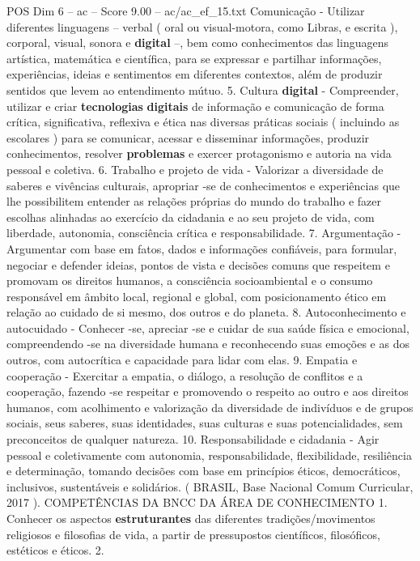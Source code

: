 \begin{textsample}{POS Dim 6 – ac – Score 9.00 – ac/ac\_ef\_15.txt}
Comunicação - Utilizar diferentes linguagens – verbal ( oral ou visual-motora, como Libras, e escrita ), corporal, visual, sonora e \textbf{digital} –, bem como conhecimentos das linguagens artística, matemática e científica, para se expressar e partilhar informações, experiências, ideias e sentimentos em diferentes contextos, além de produzir sentidos que levem ao entendimento mútuo. 5.
Cultura \textbf{digital} - Compreender, utilizar e criar \textbf{tecnologias} \textbf{digitais} de informação e comunicação de forma crítica, significativa, reflexiva e ética nas diversas práticas sociais ( incluindo as escolares ) para se comunicar, acessar e disseminar informações, produzir conhecimentos, resolver \textbf{problemas} e exercer protagonismo e autoria na vida pessoal e coletiva. 6.
Trabalho e projeto de vida - Valorizar a diversidade de saberes e vivências culturais, apropriar -se de conhecimentos e experiências que lhe possibilitem entender as relações próprias do mundo do trabalho e fazer escolhas alinhadas ao exercício da cidadania e ao seu projeto de vida, com liberdade, autonomia, consciência crítica e responsabilidade. 7.
Argumentação - Argumentar com base em fatos, dados e informações confiáveis, para formular, negociar e defender ideias, pontos de vista e decisões comuns que respeitem e promovam os direitos humanos, a consciência socioambiental e o consumo responsável em âmbito local, regional e global, com posicionamento ético em relação ao cuidado de si mesmo, dos outros e do planeta. 8.
Autoconhecimento e autocuidado - Conhecer -se, apreciar -se e cuidar de sua saúde física e emocional, compreendendo -se na diversidade humana e reconhecendo suas emoções e as dos outros, com autocrítica e capacidade para lidar com elas. 9.
Empatia e cooperação - Exercitar a empatia, o diálogo, a resolução de conflitos e a cooperação, fazendo -se respeitar e promovendo o respeito ao outro e aos direitos humanos, com acolhimento e valorização da diversidade de indivíduos e de grupos sociais, seus saberes, suas identidades, suas culturas e suas potencialidades, sem preconceitos de qualquer natureza. 10.
Responsabilidade e cidadania - Agir pessoal e coletivamente com autonomia, responsabilidade, flexibilidade, resiliência e determinação, tomando decisões com base em princípios éticos, democráticos, inclusivos, sustentáveis e solidários. ( BRASIL, Base Nacional Comum Curricular, 2017 ).
COMPETÊNCIAS DA BNCC DA ÁREA DE CONHECIMENTO 1.
Conhecer os aspectos \textbf{estruturantes} das diferentes tradições/movimentos religiosos e filosofias de vida, a partir de pressupostos científicos, filosóficos, estéticos e éticos. 2.

\end{textsample}
